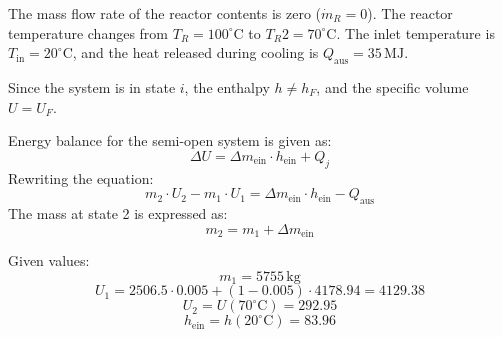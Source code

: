 The mass flow rate of the reactor contents is zero (\( \dot{m}_R = 0 \)). The reactor temperature changes from \( T_R = 100^\circ\text{C} \) to \( T_R2 = 70^\circ\text{C} \). The inlet temperature is \( T_{\text{in}} = 20^\circ\text{C} \), and the heat released during cooling is \( Q_{\text{aus}} = 35 \, \text{MJ} \).  

Since the system is in state \( i \), the enthalpy \( h \neq h_F \), and the specific volume \( U = U_F \).  

Energy balance for the semi-open system is given as:  
\[
\Delta U = \Delta m_{\text{ein}} \cdot h_{\text{ein}} + Q_j
\]  
Rewriting the equation:  
\[
m_2 \cdot U_2 - m_1 \cdot U_1 = \Delta m_{\text{ein}} \cdot h_{\text{ein}} - Q_{\text{aus}}
\]  
The mass at state 2 is expressed as:  
\[
m_2 = m_1 + \Delta m_{\text{ein}}
\]  

Given values:  
\[
m_1 = 5755 \, \text{kg}
\]  
\[
U_1 = 2506.5 \cdot 0.005 + (1 - 0.005) \cdot 4178.94 = 4129.38
\]  
\[
U_2 = U(70^\circ\text{C}) = 292.95
\]  
\[
h_{\text{ein}} = h(20^\circ\text{C}) = 83.96
\]